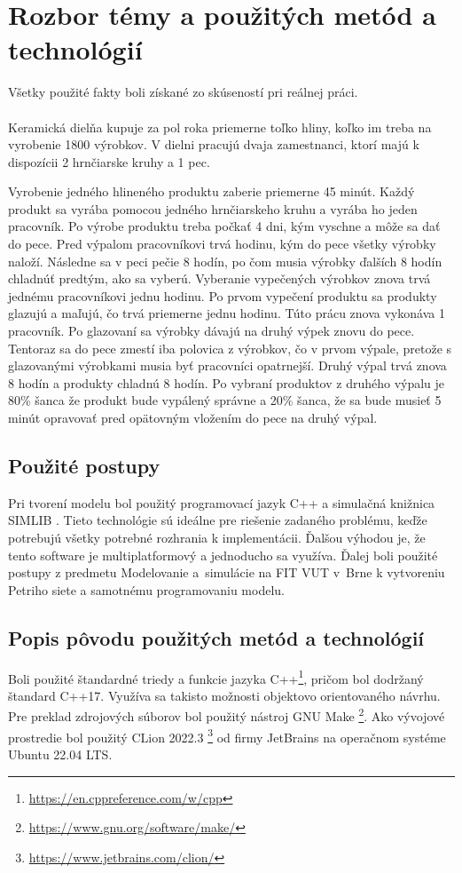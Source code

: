 \documentclass[11pt,a4paper]{article}
\begin{document}
\section{Rozbor témy a použitých metód a technológií}
\label{used_methods}
Všetky použité fakty boli získané zo skúseností pri reálnej práci. \\\\
Keramická dielňa kupuje za pol roka priemerne toľko hliny, koľko im treba na vyrobenie 1800 výrobkov. V dielni pracujú dvaja zamestnanci, ktorí majú k dispozícii 2 hrnčiarske kruhy a 1 pec.

Vyrobenie jedného hlineného produktu zaberie priemerne 45 minút. Každý produkt sa vyrába pomocou jedného hrnčiarskeho kruhu a vyrába ho jeden pracovník. Po výrobe produktu treba počkať 4 dni, kým vyschne a môže sa dať do pece. Pred výpalom pracovníkovi trvá hodinu, kým do pece všetky výrobky naloží. Následne sa v peci pečie 8 hodín, po čom musia výrobky ďalších 8 hodín chladnúť predtým, ako sa vyberú. Vyberanie vypečených výrobkov znova trvá jednému pracovníkovi jednu hodinu. Po prvom vypečení produktu sa produkty glazujú a maľujú, čo trvá priemerne jednu hodinu. Túto prácu znova vykonáva 1 pracovník. Po glazovaní sa výrobky dávajú na druhý výpek znovu do pece. Tentoraz sa do pece zmestí iba polovica z výrobkov, čo v prvom výpale, pretože s glazovanými výrobkami musia byť pracovníci opatrnejší. Druhý výpal trvá znova 8 hodín a produkty chladnú 8 hodín. Po vybraní produktov z druhého výpalu je 80\% šanca že produkt bude vypálený správne a 20\% šanca, že sa bude musieť 5 minút opravovať pred opätovným vložením do pece na druhý výpal.

\subsection{Použité postupy}
Pri tvorení modelu bol použitý programovací jazyk C++ a simulačná knižnica SIMLIB \cite{SIMLIB}. Tieto technológie sú ideálne pre riešenie zadaného problému, keďže potrebujú všetky potrebné rozhrania k implementácii. Ďalšou výhodou je, že tento software je multiplatformový a jednoducho sa využíva. Ďalej boli použité postupy z predmetu Modelovanie a~simulácie na FIT VUT v~Brne \cite{IMS_slides} k vytvoreniu Petriho siete \cite[123. strana]{IMS_slides} a samotnému programovaniu modelu.

\subsection{Popis pôvodu použitých metód a technológií}
Boli použité štandardné triedy a funkcie jazyka C++\footnote{\url{https://en.cppreference.com/w/cpp}}, pričom bol dodržaný štandard C++17. Využíva sa takisto možnosti objektovo orientovaného návrhu. Pre preklad zdrojových súborov bol použitý nástroj GNU Make \footnote{\url{https://www.gnu.org/software/make/}}. Ako vývojové prostredie bol použitý CLion 2022.3 \footnote{\url{https://www.jetbrains.com/clion/}} od firmy JetBrains na operačnom systéme Ubuntu 22.04 LTS.
\end{document}
